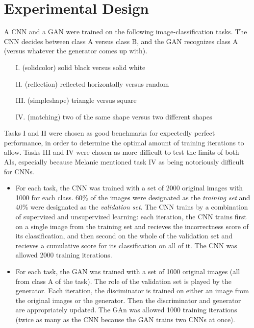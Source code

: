 \documentclass{article}
\renewcommand{\it}{\textit}
\begin{document}
\section{Experimental Design}

A CNN and a GAN were trained on the following image-classification tasks.
The CNN decides between class A versus class B, and the GAN recognizes class A (versus whatever the generator comes up with).
\begin{enumerate}
\item[I.] (solidcolor) solid black versus solid white
\item[II.] (reflection) reflected horizontally versus random
\item[III.] (simpleshape) triangle versus square
\item[IV.] (matching) two of the same shape versus two different shapes
\end{enumerate}

Tasks I and II were chosen as good benchmarks for expectedly perfect performance, in order to determine the optimal amount of training iterations to allow.
Tasks III and IV were chosen as more difficult to test the limits of both AIs, especially because Melanie mentioned task IV as being notoriously difficult for CNNs.

\begin{itemize}
\item
For each task, the CNN was trained with a set of 2000 original images with 1000 for each class.
60\% of the images were designated as the \it{training set} and 40\% were designated as the \it{validation set}.
The CNN trains by a combination of supervized and unsupervized learning: each iteration, the CNN trains first on a single image from the training set and recieves the incorrectness score of its classification, and then second on the whole of the validation set and recieves a cumulative score for its classification on all of it.
The CNN was allowed 2000 training iterations.

\item
For each task, the GAN was trained with a set of 1000 original images (all from class A of the task). The role of the validation set is played by the generator.
Each iteration, the disciminator is trained on either an image from the original images or the generator. Then the discriminator and generator are appropriately updated.
The GAn was allowed 1000 training iterations (twice as many as the CNN because the GAN trains two CNNs at once).
\end{itemize}
\end{document}
